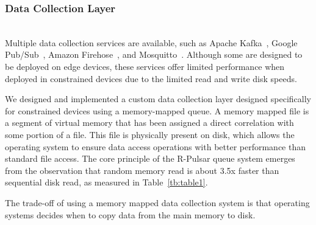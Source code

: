 \subsubsection{Data Collection Layer}
\hfill\\
Multiple data collection services are available, such as Apache Kafka~\cite{kafka}, Google Pub/Sub~\cite{google}, Amazon Firehose~\cite{amazon}, and Mosquitto~\cite{mosquitto}. Although some are designed to be deployed on edge devices, these services offer limited performance when deployed in constrained devices due to the limited read and write disk speeds.

We designed and implemented a custom data collection layer designed specifically for constrained devices using a memory-mapped queue. A memory mapped file is a segment of virtual memory that has been assigned a direct correlation with some portion of a file. This file is physically present on disk, which allows the operating system to ensure data access operations with better performance than standard file access. The core principle of the R-Pulsar queue system emerges from the observation that random memory read is about 3.5x faster than sequential disk read, as measured in Table~\ref{tb:table1}. 

The trade-off of using a memory mapped data collection system is that operating systems decides when to copy data from the main memory to disk. %

\begin{table}[h!]
\centering

\caption{Measurements of Disk I/O vs RAM memory performance on a Raspberry Pi.} \label{tb:table1}
\end{table}

